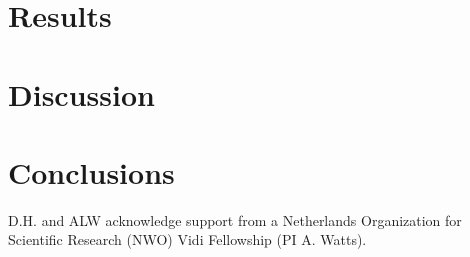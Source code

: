 \documentclass[numberedappendix]{emulateapj}
\begin{document}
\section{Results}
\label{sec:results}



\section{Discussion}
\label{sec:discussion}

\section{Conclusions}


\acknowledgments
D.H. and ALW acknowledge support from a Netherlands Organization for Scientific Research (NWO) Vidi Fellowship (PI A. Watts).  




\end{document}
